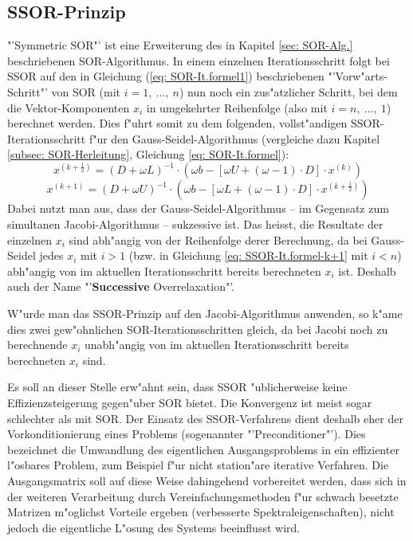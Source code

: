 \begin{refsection}
\section{SSOR-Prinzip}
"'Symmetric SOR"' ist eine Erweiterung des in Kapitel \ref{sec: SOR-Alg.}
beschriebenen SOR-Algorithmus. In einem einzelnen Iterationsschritt
folgt bei SSOR auf den in Gleichung (\ref{eq: SOR-It.formel1})
beschriebenen "'Vorw"arts-Schritt"' von SOR (mit $i=1,\ ...,\ n$) nun
noch ein zus"atzlicher Schritt, bei dem die Vektor-Komponenten $x_i$ in
umgekehrter Reihenfolge (also mit $i=n,\ ...,\ 1$) berechnet werden. Dies
f"uhrt somit zu dem folgenden, vollst"andigen SSOR-Iterationsschritt
f"ur den Gauss-Seidel-Algorithmus (vergleiche dazu Kapitel \ref{subsec:
SOR-Herleitung}, Gleichung \ref{eq: SOR-It.formel}):
\begin{equation} \label{eq: SSOR-It.formel-k+1/2}
	x^{(k+\frac{1}{2})}=(D+\omega L)^{-1}\cdot(\omega b-[\omega U+(\omega-1)\cdot D]\cdot x^{(k)})
\end{equation}
\begin{equation} \label{eq: SSOR-It.formel-k+1}
	x^{(k+1)}=(D+\omega U)^{-1}\cdot(\omega b-[\omega L+(\omega-1)\cdot D]\cdot x^{(k+\frac{1}{2})})
\end{equation}
Dabei nutzt man aus, dass der Gauss-Seidel-Algorithmus -- im Gegensatz
zum simultanen Jacobi-Algorithmus -- sukzessive ist. Das heisst, die
Resultate der einzelnen $x_i$ sind abh"angig von der Reihenfolge derer
Berechnung, da bei Gauss-Seidel jedes $x_i$ mit $i>1$ (bzw. in Gleichung
\ref{eq: SSOR-It.formel-k+1} mit $i<n$) abh"angig von im aktuellen
Iterationsschritt bereits berechneten $x_i$ ist. Deshalb auch der Name
"'\textbf{Successive} Overrelaxation"'.

W"urde man das SSOR-Prinzip auf den Jacobi-Algorithmus anwenden, so k"ame
dies zwei gew"ohnlichen SOR-Iterationsschritten gleich, da bei Jacobi
noch zu berechnende $x_i$ unabh"angig von im aktuellen Iterationsschritt
bereits berechneten $x_i$ sind.

Es soll an dieser Stelle erw"ahnt sein, dass SSOR "ublicherweise keine
Effizienzsteigerung gegen"uber SOR bietet. Die Konvergenz ist meist sogar
schlechter als mit SOR. Der Einsatz des SSOR-Verfahrens dient deshalb
eher der Vorkonditionierung \cite{Vorkonditionierung_Dorn} eines Problems
(sogenannter "'Preconditioner"'). Dies bezeichnet die Umwandlung des
eigentlichen Ausgangsproblems in ein effizienter l"osbares Problem, zum
Beispiel f"ur nicht station"are iterative Verfahren. Die Ausgangsmatrix
soll auf diese Weise dahingehend vorbereitet werden, dass sich in der
weiteren Verarbeitung durch Vereinfachungsmethoden f"ur schwach besetzte
Matrizen m"oglichst Vorteile ergeben (verbesserte Spektraleigenschaften),
nicht jedoch die eigentliche L"osung des Systems beeinflusst wird.

\printbibliography[heading=subbibliography]
\end{refsection}
